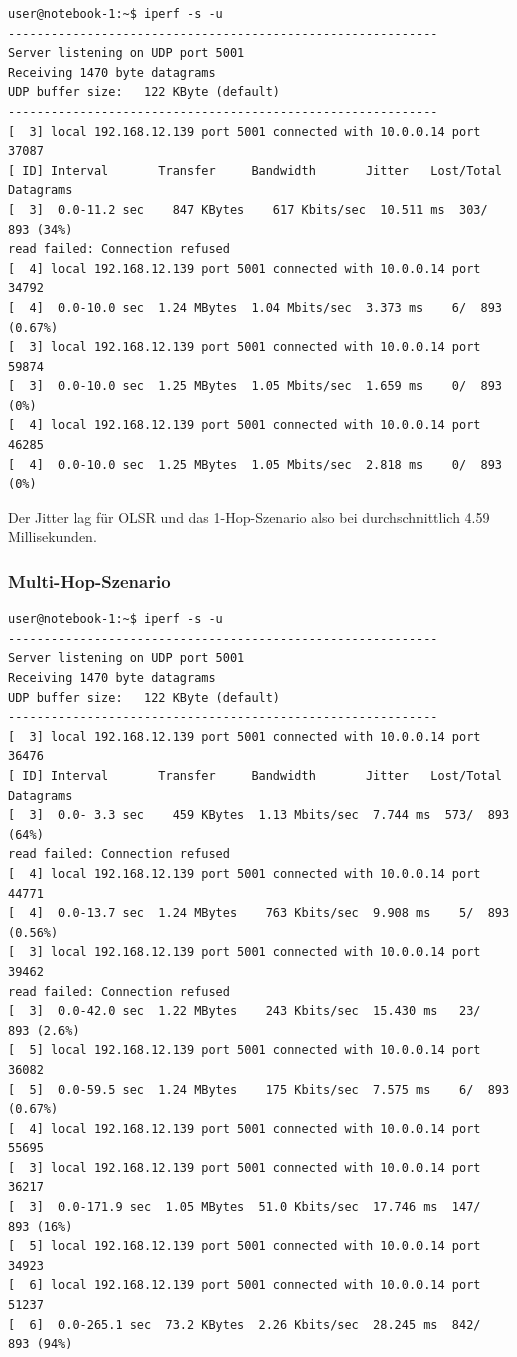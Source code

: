 \documentclass[a4paper,10pt]{article}
\begin{document}
\begin{lstlisting}
user@notebook-1:~$ iperf -s -u
------------------------------------------------------------
Server listening on UDP port 5001
Receiving 1470 byte datagrams
UDP buffer size:   122 KByte (default)
------------------------------------------------------------
[  3] local 192.168.12.139 port 5001 connected with 10.0.0.14 port 37087
[ ID] Interval       Transfer     Bandwidth       Jitter   Lost/Total Datagrams
[  3]  0.0-11.2 sec    847 KBytes    617 Kbits/sec  10.511 ms  303/  893 (34%)
read failed: Connection refused
[  4] local 192.168.12.139 port 5001 connected with 10.0.0.14 port 34792
[  4]  0.0-10.0 sec  1.24 MBytes  1.04 Mbits/sec  3.373 ms    6/  893 (0.67%)
[  3] local 192.168.12.139 port 5001 connected with 10.0.0.14 port 59874
[  3]  0.0-10.0 sec  1.25 MBytes  1.05 Mbits/sec  1.659 ms    0/  893 (0%)
[  4] local 192.168.12.139 port 5001 connected with 10.0.0.14 port 46285
[  4]  0.0-10.0 sec  1.25 MBytes  1.05 Mbits/sec  2.818 ms    0/  893 (0%)
\end{lstlisting}

Der Jitter lag für OLSR und das 1-Hop-Szenario also bei durchschnittlich 4.59 Millisekunden.

\subsubsection*{Multi-Hop-Szenario}

\begin{lstlisting}
user@notebook-1:~$ iperf -s -u
------------------------------------------------------------
Server listening on UDP port 5001
Receiving 1470 byte datagrams
UDP buffer size:   122 KByte (default)
------------------------------------------------------------
[  3] local 192.168.12.139 port 5001 connected with 10.0.0.14 port 36476
[ ID] Interval       Transfer     Bandwidth       Jitter   Lost/Total Datagrams
[  3]  0.0- 3.3 sec    459 KBytes  1.13 Mbits/sec  7.744 ms  573/  893 (64%)
read failed: Connection refused
[  4] local 192.168.12.139 port 5001 connected with 10.0.0.14 port 44771
[  4]  0.0-13.7 sec  1.24 MBytes    763 Kbits/sec  9.908 ms    5/  893 (0.56%)
[  3] local 192.168.12.139 port 5001 connected with 10.0.0.14 port 39462
read failed: Connection refused
[  3]  0.0-42.0 sec  1.22 MBytes    243 Kbits/sec  15.430 ms   23/  893 (2.6%)
[  5] local 192.168.12.139 port 5001 connected with 10.0.0.14 port 36082
[  5]  0.0-59.5 sec  1.24 MBytes    175 Kbits/sec  7.575 ms    6/  893 (0.67%)
[  4] local 192.168.12.139 port 5001 connected with 10.0.0.14 port 55695
[  3] local 192.168.12.139 port 5001 connected with 10.0.0.14 port 36217
[  3]  0.0-171.9 sec  1.05 MBytes  51.0 Kbits/sec  17.746 ms  147/  893 (16%)
[  5] local 192.168.12.139 port 5001 connected with 10.0.0.14 port 34923
[  6] local 192.168.12.139 port 5001 connected with 10.0.0.14 port 51237
[  6]  0.0-265.1 sec  73.2 KBytes  2.26 Kbits/sec  28.245 ms  842/  893 (94%)
\end{lstlisting}
\end{document}
